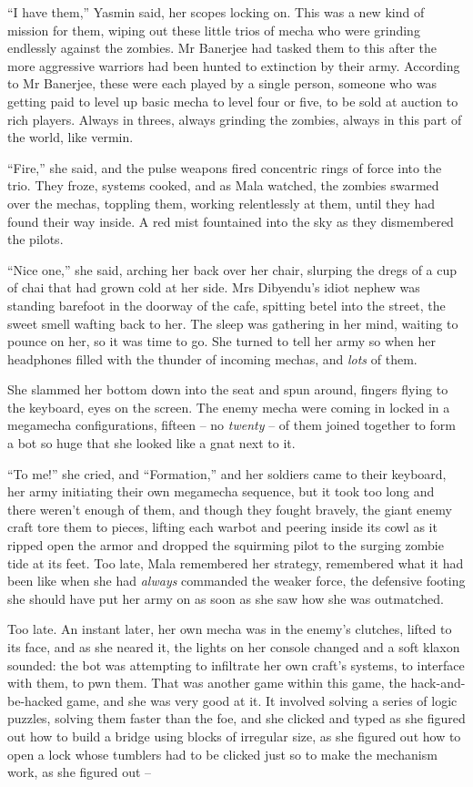 ``I have them,'' Yasmin said, her scopes locking on. This was a new
kind of mission for them, wiping out these little trios of mecha
who were grinding endlessly against the zombies. Mr Banerjee had
tasked them to this after the more aggressive warriors had been
hunted to extinction by their army. According to Mr Banerjee, these
were each played by a single person, someone who was getting paid
to level up basic mecha to level four or five, to be sold at
auction to rich players. Always in threes, always grinding the
zombies, always in this part of the world, like vermin.

``Fire,'' she said, and the pulse weapons fired concentric rings of
force into the trio. They froze, systems cooked, and as Mala
watched, the zombies swarmed over the mechas, toppling them,
working relentlessly at them, until they had found their way
inside. A red mist fountained into the sky as they dismembered the
pilots.

``Nice one,'' she said, arching her back over her chair, slurping the
dregs of a cup of chai that had grown cold at her side. Mrs
Dibyendu's idiot nephew was standing barefoot in the doorway of the
cafe, spitting betel into the street, the sweet smell wafting back
to her. The sleep was gathering in her mind, waiting to pounce on
her, so it was time to go. She turned to tell her army so when her
headphones filled with the thunder of incoming mechas, and
\emph{lots} of them.

She slammed her bottom down into the seat and spun around, fingers
flying to the keyboard, eyes on the screen. The enemy mecha were
coming in locked in a megamecha configurations, fifteen -- no
\emph{twenty} -- of them joined together to form a bot so huge that
she looked like a gnat next to it.

``To me!'' she cried, and ``Formation,'' and her soldiers came to their
keyboard, her army initiating their own megamecha sequence, but it
took too long and there weren't enough of them, and though they
fought bravely, the giant enemy craft tore them to pieces, lifting
each warbot and peering inside its cowl as it ripped open the armor
and dropped the squirming pilot to the surging zombie tide at its
feet. Too late, Mala remembered her strategy, remembered what it
had been like when she had \emph{always} commanded the weaker
force, the defensive footing she should have put her army on as
soon as she saw how she was outmatched.

Too late. An instant later, her own mecha was in the enemy's
clutches, lifted to its face, and as she neared it, the lights on
her console changed and a soft klaxon sounded: the bot was
attempting to infiltrate her own craft's systems, to interface with
them, to pwn them. That was another game within this game, the
hack-and-be-hacked game, and she was very good at it. It involved
solving a series of logic puzzles, solving them faster than the
foe, and she clicked and typed as she figured out how to build a
bridge using blocks of irregular size, as she figured out how to
open a lock whose tumblers had to be clicked just so to make the
mechanism work, as she figured out --

